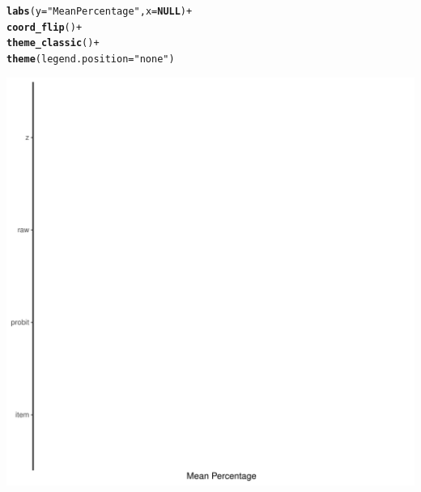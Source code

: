 \documentclass{article}\usepackage[]{graphicx}\usepackage[]{color}
\makeatletter
\def\maxwidth{ %
  \ifdim\Gin@nat@width>\linewidth
    \linewidth
  \else
    \Gin@nat@width
  \fi
}
\newcommand{\hlstr}[1]{\textcolor[rgb]{0.192,0.494,0.8}{#1}}%
\newcommand{\hlopt}[1]{\textcolor[rgb]{0,0,0}{#1}}%
\newcommand{\hlstd}[1]{\textcolor[rgb]{0.345,0.345,0.345}{#1}}%
\newcommand{\hlkwa}[1]{\textcolor[rgb]{0.161,0.373,0.58}{\textbf{#1}}}%
\newcommand{\hlkwc}[1]{\textcolor[rgb]{0.333,0.667,0.333}{#1}}%
\newcommand{\hlkwd}[1]{\textcolor[rgb]{0.737,0.353,0.396}{\textbf{#1}}}%
\newenvironment{kframe}{%
 \def\at@end@of@kframe{}%
 \ifinner\ifhmode%
  \def\at@end@of@kframe{\end{minipage}}%
  \begin{minipage}{\columnwidth}%
 \fi\fi%
 \def\FrameCommand##1{\hskip\@totalleftmargin \hskip-\fboxsep
 \colorbox{shadecolor}{##1}\hskip-\fboxsep
     \hskip-\linewidth \hskip-\@totalleftmargin \hskip\columnwidth}%
 \MakeFramed {\advance\hsize-\width
   \@totalleftmargin\z@ \linewidth\hsize
   \@setminipage}}%
 {\par\unskip\endMakeFramed%
 \at@end@of@kframe}
\newenvironment{knitrout}{}{} %
\makeatother
\begin{document}
\begin{knitrout}
\begin{kframe}
\begin{alltt}
    \hlkwd{labs}\hlstd{(}\hlkwc{y} \hlstd{=} \hlstr{"Mean Percentage"}\hlstd{,} \hlkwc{x} \hlstd{=} \hlkwa{NULL}\hlstd{)} \hlopt{+}
    \hlkwd{coord_flip}\hlstd{()} \hlopt{+}
    \hlkwd{theme_classic}\hlstd{()} \hlopt{+}
    \hlkwd{theme}\hlstd{(}\hlkwc{legend.position} \hlstd{=} \hlstr{"none"}\hlstd{)}
\end{alltt}
\end{kframe}
\includegraphics[width=\maxwidth]{figure/unnamed-chunk-13-1} 

\end{knitrout}
\end{document}
